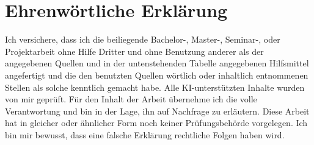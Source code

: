 \section*{Ehrenwörtliche Erklärung}

Ich versichere, dass ich die beiliegende Bachelor-, Master-, Seminar-, oder
Projektarbeit ohne Hilfe Dritter und ohne Benutzung anderer als der angegebenen
Quellen und in der untenstehenden Tabelle angegebenen Hilfsmittel angefertigt
und die den benutzten Quellen wörtlich oder inhaltlich entnommenen Stellen als
solche kenntlich gemacht habe. Alle KI-unterstützten Inhalte wurden von mir
geprüft. Für den Inhalt der Arbeit übernehme ich die volle Verantwortung und bin
in der Lage, ihn auf Nachfrage zu erläutern. Diese Arbeit hat in gleicher oder
ähnlicher Form noch keiner Prüfungsbehörde vorgelegen. Ich bin mir bewusst, dass
eine falsche Erklärung rechtliche Folgen haben wird.

